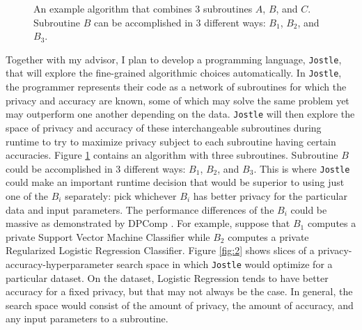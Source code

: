 \documentclass[10.5pt]{article}
\begin{document}
\begin{figure}
\begin{center}
\end{center}
\caption{An example algorithm that combines 3 subroutines $A$, $B$, and $C$. Subroutine $B$ can be accomplished in 3 different ways: $B_1$, $B_2$, and $B_3$.}
\label{fig:1}
\end{figure}
Together with my advisor, I plan to develop a programming language, \texttt{Jostle}, that will explore the fine-grained algorithmic choices automatically. In \texttt{Jostle}, the programmer represents their code as a network of subroutines for which the privacy and accuracy are known, some of which may solve the same problem yet may outperform one another depending on the data. \texttt{Jostle} will then explore the space of privacy and accuracy of these interchangeable subroutines during runtime to try to maximize privacy subject to each subroutine having certain accuracies. Figure \ref{fig:1} contains an algorithm with three subroutines. Subroutine $B$ could be accomplished in 3 different ways: $B_1$, $B_2$, and $B_3$. This is where \texttt{Jostle} could make an important runtime decision that would be superior to using just one of the $B_i$ separately: pick whichever $B_i$ has better privacy for the particular data and input parameters. The performance differences of the $B_i$ could be massive as demonstrated by DPComp \cite{Hay:2016}. For example, suppose that $B_1$ computes a private Support Vector Machine Classifier while $B_2$ computes a private Regularized Logistic Regression Classifier. Figure \ref{fig:2} shows slices of a privacy-accuracy-hyperparameter search space in which \texttt{Jostle} would optimize for a particular dataset. On the dataset, Logistic Regression tends to have better accuracy for a fixed privacy, but that may not always be the case. In general, the search space would consist of the amount of privacy, the amount of accuracy, and any input parameters to a subroutine. 
\end{document}
